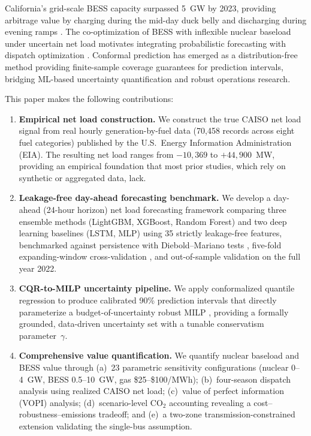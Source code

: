 \documentclass[preprint,12pt,authoryear]{elsarticle}
\begin{document}
California's grid-scale BESS capacity surpassed 5~GW by 2023, providing arbitrage value by charging during the mid-day duck belly and discharging during evening ramps \citep{denholm2022b,schmidt2019}. The co-optimization of BESS with inflexible nuclear baseload under uncertain net load motivates integrating probabilistic forecasting with dispatch optimization \citep{morales2014,conejo2010}. Conformal prediction \citep{vovk2005,angelopoulos2023} has emerged as a distribution-free method providing finite-sample coverage guarantees for prediction intervals, bridging ML-based uncertainty quantification and robust operations research.

This paper makes the following contributions:

\begin{enumerate}
    \item \textbf{Empirical net load construction.} We construct the true CAISO net load signal from real hourly generation-by-fuel data (70{,}458 records across eight fuel categories) published by the U.S.\ Energy Information Administration (EIA). The resulting net load ranges from $-10{,}369$ to $+44{,}900$~MW, providing an empirical foundation that most prior studies, which rely on synthetic or aggregated data, lack.

    \item \textbf{Leakage-free day-ahead forecasting benchmark.} We develop a day-ahead (24-hour horizon) net load forecasting framework comparing three ensemble methods (LightGBM, XGBoost, Random Forest) and two deep learning baselines (LSTM, MLP) using 35 strictly leakage-free features, benchmarked against persistence with Diebold--Mariano tests \citep{diebold1995}, five-fold expanding-window cross-validation \citep{bergmeir2012}, and out-of-sample validation on the full year 2022.

    \item \textbf{CQR-to-MILP uncertainty pipeline.} We apply conformalized quantile regression \citep{romano2019} to produce calibrated 90\% prediction intervals that directly parameterize a budget-of-uncertainty robust MILP \citep{bertsimas2004}, providing a formally grounded, data-driven uncertainty set with a tunable conservatism parameter~$\gamma$.

    \item \textbf{Comprehensive value quantification.} We quantify nuclear baseload and BESS value through (a)~23 parametric sensitivity configurations (nuclear 0--4~GW, BESS 0.5--10~GW, gas \$25--\$100/MWh); (b)~four-season dispatch analysis using realized CAISO net load; (c)~value of perfect information (VOPI) analysis; (d)~scenario-level CO$_2$ accounting revealing a cost--robustness--emissions tradeoff; and (e)~a two-zone transmission-constrained extension validating the single-bus assumption.


\end{enumerate}
\end{document}
